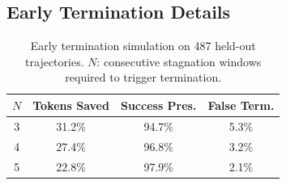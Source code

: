 \documentclass[11pt,a4paper]{article}
\begin{document}
\subsection{Early Termination Details}
\label{app:early-term}

\begin{table}[h]
\centering
\small
\begin{tabular}{cccc}
\toprule
\textbf{$N$} & \textbf{Tokens Saved} & \textbf{Success Pres.} & \textbf{False Term.} \\
\midrule
3 & 31.2\% & 94.7\% & 5.3\% \\
4 & 27.4\% & 96.8\% & 3.2\% \\
5 & 22.8\% & 97.9\% & 2.1\% \\
\bottomrule
\end{tabular}
\caption{Early termination simulation on 487 held-out trajectories. $N$: consecutive stagnation windows required to trigger termination.}
\label{tab:early-term}
\end{table}
\end{document}
